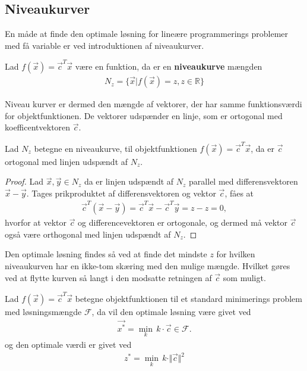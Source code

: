 \subsection{Niveaukurver}
En måde at finde den optimale løsning for lineære programmerings problemer med få variable er ved introduktionen af niveaukurver.
\begin{defn}[Niveaukurver]
Lad $f(\vec{x})= \vec{c}^T\vec{x}$ være en funktion, da er en \textbf{niveaukurve} mængden 
\begin{align*}
N_z = \{\vec{x}| f(\vec{x}) = z, z \in \mathds{R}\}
\end{align*}
\end{defn}
Niveau kurver er dermed den mængde af vektorer, der har samme funktionsværdi for objektfunktionen. 
De vektorer udspænder en linje, som er ortogonal med koefficentvektoren $\vec{c}$.
\begin{stn}
Lad $N_z$ betegne en niveaukurve, til objektfunktionen $f(\vec{x})= \vec{c}^T\vec{x}$, da er $\vec{c}$ ortogonal med linjen udspændt af $N_z$.
\end{stn}
\begin{proof}
Lad $\vec{x}, \vec{y} \in N_z$ da er linjen udspændt af $N_z$ parallel med differensvektoren $\vec{x}-\vec{y}$.
Tages prikproduktet af differensvektoren og vektor $\vec{c}$, fåes at
\begin{align*}
\vec{c}^T(\vec{x}-\vec{y}) = \vec{c}^T\vec{x} -\vec{c}^T\vec{y} = z - z = 0,
\end{align*}
hvorfor at vektor $\vec{c}$ og differencevektoren er ortogonale, og dermed må vektor $\vec{c}$ også være orthogonal med linjen udspændt af $N_z$.
\end{proof}
Den optimale løsning findes så ved at finde det mindste $z$ for hvilken niveaukurven har en ikke-tom skæring med den mulige mængde. 
Hvilket gøres ved at flytte kurven så langt i den modsatte retningen af $\vec{c}$ som muligt.
\begin{stn}
Lad $f(\vec{x})=\vec{c}^T\vec{x}$ betegne objektfunktionen til et standard minimerings problem med løsningsmængde $\mathcal{F}$, da vil den optimale løsning være givet ved 
\begin{align*}
\vec{x^*}=\underset{k}{\min} \, k \cdot \vec{c} \in \mathcal{F}.
\end{align*}
og den optimale værdi er givet ved
\begin{align*}
z^* = \underset{k}{\min} \, k \cdot \Vert \vec{c} \Vert ^2
\end{align*}
\label{stn:niveau}
\end{stn}
